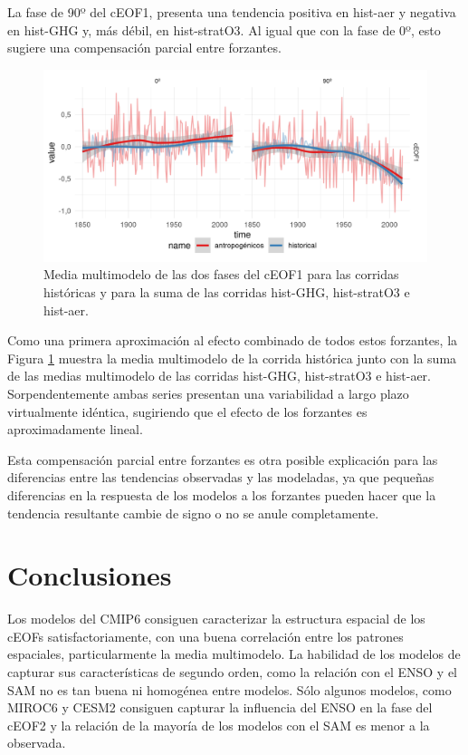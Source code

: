 \documentclass[12pt,oneside,a4paper]{reedthesis}
\begin{document}
La fase de 90º del cEOF1, presenta una tendencia positiva en hist-aer y negativa en hist-GHG y, más débil, en hist-stratO3.
Al igual que con la fase de 0º, esto sugiere una compensación parcial entre forzantes.



\begin{figure}

{\centering \includegraphics{figures/50-cmip6/suma-1} 

}

\caption{Media multimodelo de las dos fases del cEOF1 para las corridas históricas y para la suma de las corridas hist-GHG, hist-stratO3 e hist-aer.}\label{fig:suma}
\end{figure}

Como una primera aproximación al efecto combinado de todos estos forzantes, la Figura \ref{fig:suma} muestra la media multimodelo de la corrida histórica junto con la suma de las medias multimodelo de las corridas hist-GHG, hist-stratO3 e hist-aer.
Sorpendentemente ambas series presentan una variabilidad a largo plazo virtualmente idéntica, sugiriendo que el efecto de los forzantes es aproximadamente lineal.

Esta compensación parcial entre forzantes es otra posible explicación para las diferencias entre las tendencias observadas y las modeladas, ya que pequeñas diferencias en la respuesta de los modelos a los forzantes pueden hacer que la tendencia resultante cambie de signo o no se anule completamente.

\hypertarget{conclusiones-2}{%
\section{Conclusiones}\label{conclusiones-2}}

Los modelos del CMIP6 consiguen caracterizar la estructura espacial de los cEOFs satisfactoriamente, con una buena correlación entre los patrones espaciales, particularmente la media multimodelo.
La habilidad de los modelos de capturar sus características de segundo orden, como la relación con el ENSO y el SAM no es tan buena ni homogénea entre modelos.
Sólo algunos modelos, como MIROC6 y CESM2 consiguen capturar la influencia del ENSO en la fase del cEOF2 y la relación de la mayoría de los modelos con el SAM es menor a la observada.
\end{document}
